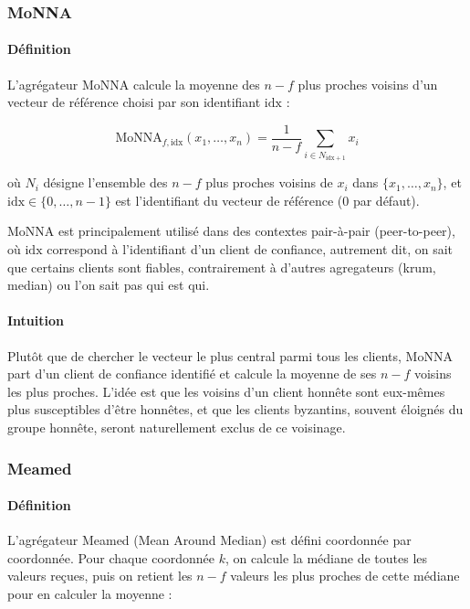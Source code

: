 \documentclass[a4paper,11pt]{article}
\begin{document}
\subsubsection{MoNNA}

\paragraph{Définition}

L'agrégateur MoNNA calcule la moyenne des $n-f$ plus proches voisins d'un vecteur de référence choisi par son identifiant $\mathrm{idx}$ :

\[
\mathrm{MoNNA}_{f,\mathrm{idx}}(x_1,\dots,x_n) = \frac{1}{n-f}\sum_{i \in N_{\mathrm{idx}+1}} x_i
\]

où $N_i$ désigne l'ensemble des $n-f$ plus proches voisins de $x_i$ dans $\{x_1,\dots,x_n\}$, et $\mathrm{idx} \in \{0,\dots,n-1\}$ est l'identifiant du vecteur de référence (0 par défaut).

MoNNA est principalement utilisé dans des contextes pair-à-pair (peer-to-peer), où $\mathrm{idx}$ correspond à l'identifiant d'un client de confiance, autrement dit, on sait que certains clients sont fiables, contrairement à d'autres agregateurs (krum, median) ou l'on sait pas qui est qui.

\paragraph{Intuition}

Plutôt que de chercher le vecteur le plus central parmi tous les clients, MoNNA part d'un client de confiance identifié et calcule la moyenne de ses $n-f$ voisins les plus proches. L'idée est que les voisins d'un client honnête sont eux-mêmes plus susceptibles d'être honnêtes, et que les clients byzantins, souvent éloignés du groupe honnête, seront naturellement exclus de ce voisinage.

\subsubsection{Meamed}

\paragraph{Définition}

L'agrégateur Meamed (Mean Around Median) est défini coordonnée par coordonnée. Pour chaque coordonnée $k$, on calcule la médiane de toutes les valeurs reçues, puis on retient les $n-f$ valeurs les plus proches de cette médiane pour en calculer la moyenne :
\end{document}
